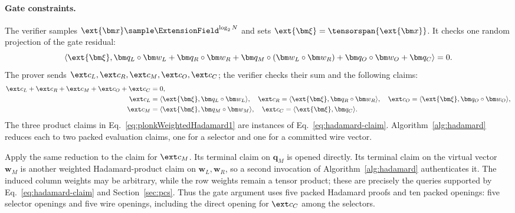 \paragraph{Gate constraints.}
The verifier samples
\(\ext{\bm x}\sample\ExtensionField^{\log_2N}\) and sets
\(\ext{\bm\xi}=\tensorspan{\ext{\bm x}}\).
It checks one random projection of the gate residual:
\begin{equation}
    \left\langle \ext{\bm\xi},
    \bm q_L\circ\bm w_L+\bm q_R\circ\bm w_R
    +\bm q_M\circ(\bm w_L\circ\bm w_R)
    +\bm q_O\circ\bm w_O+\bm q_C\right\rangle=0.
\label{eq:plonkWeight}
\end{equation}
The prover sends
\(\ext c_L,\ext c_R,\ext c_M,\ext c_O,\ext c_C\);
the verifier checks their sum and the following claims:
\begin{align}
    \ext c_L+\ext c_R+\ext c_M+\ext c_O+\ext c_C&=0,
    \nonumber\\
    \ext c_L&=\langle\ext{\bm\xi},\bm q_L\circ\bm w_L\rangle,
    \quad
    \ext c_R=\langle\ext{\bm\xi},\bm q_R\circ\bm w_R\rangle,
    \quad
    \ext c_O=\langle\ext{\bm\xi},\bm q_O\circ\bm w_O\rangle,
    \label{eq:plonkWeightedHadamard1}\\
    \ext c_M&=\langle\ext{\bm\xi},\bm q_M\circ\bm w_M\rangle,
    \quad
    \ext c_C=\langle\ext{\bm\xi},\bm q_C\rangle.
    \label{eq:plonkWeightedHadamard2}
\end{align}
The three product claims in Eq.~\eqref{eq:plonkWeightedHadamard1}
are instances of Eq.~\eqref{eq:hadamard-claim}.
Algorithm~\ref{alg:hadamard} reduces each to two packed evaluation
claims, one for a selector and one for a committed wire vector.

Apply the same reduction to the claim for \(\ext c_M\).
Its terminal claim on \(\bm q_M\) is opened directly.
Its terminal claim on the virtual vector \(\bm w_M\) is another
weighted Hadamard-product claim on \(\bm w_L,\bm w_R\), so a
second invocation of Algorithm~\ref{alg:hadamard} authenticates it.
The induced column weights may be arbitrary, while the row weights
remain a tensor product; these are precisely the queries supported
by Eq.~\eqref{eq:hadamard-claim} and Section~\ref{sec:pcs}.
Thus the gate argument uses five packed Hadamard proofs and
ten packed openings: five selector openings and five wire openings,
including the direct opening for \(\ext c_C\) among the selectors.

